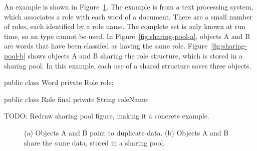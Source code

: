 An example is shown in Figure~\ref{fig:sharing-pool}. The example is from a
text processing system, which associates a role with each word of a document.
There are a small number of roles, each identified by a  role name. The complete set
is only known at run time, so an 
type cannot be used.  In Figure~\ref{fig:sharing-pool-a}, objects A and B are
words that have been classifed as having the same role. 
Figure~\ref{fig:sharing-pool-b} shows objects A and B sharing the role
structure, which is stored in a sharing pool. In this example, each use of a
shared structure saves three objects.

\begin{shortlisting}
public class Word {
	private Role role;
}

public class Role {
	final private String roleName;
}
\end{shortlisting}

TODO: Redraw sharing pool figure, making it a concrete example.

\begin{figure}
\centering
	\hspace{0.18\textwidth}
	\caption{(a) Objects A and B point to duplicate data. (b) Objects A and B
  share the same data, stored in a sharing pool.}
	\label{fig:sharing-pool}
\end{figure}

